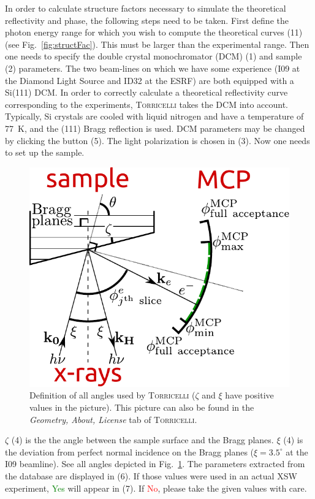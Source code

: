 \documentclass[oldfontcommands,openany,oneside]{memoir}
\begin{document}
In order to calculate structure factors necessary to simulate the theoretical reflectivity and phase, the following steps need to be taken. First define the photon energy range for which you wish to compute the theoretical curves (11) (see Fig.~\ref{fig:structFac}). This must be larger than the experimental range. Then one needs to specify the double crystal monochromator (DCM) (1) and sample (2) parameters. The two beam-lines on which we have some experience (I09 at the Diamond Light Source and ID32 at the ESRF) are both equipped with a Si(111) DCM. In order to correctly calculate a theoretical reflectivity curve corresponding to the experiments, \textsc{Torricelli} takes the DCM into account. Typically, Si crystals are cooled with liquid nitrogen and have a temperature of 77~K, and the (111) Bragg reflection is used. DCM parameters may be changed by clicking the  button (5). The light polarization is chosen in (3). Now one needs to set up the sample.
\begin{figure}[!t]
  \centering
  \includegraphics[width=.7\textwidth]{img/Geometry.pdf}
  \caption{Definition of all angles used by \textsc{Torricelli} ($\zeta$ and $\xi$ have positive values in the picture). This picture can also be found in the \emph{Geometry, About, License} tab  of \textsc{Torricelli}.}
  \label{fig:geometry}
\end{figure}
$\zeta$ (4) is the the angle between the sample surface and the Bragg planes. $\xi$ (4) is the deviation from perfect normal incidence on the Bragg planes ($\xi=3.5^\circ$ at the I09 beamline). See all angles depicted in Fig.~\ref{fig:geometry}. The parameters extracted from the database are displayed in (6). If those values were used in an actual XSW experiment, \textcolor{green}{Yes} will appear in (7). If \textcolor{red}{No}, please take the given values with care.
\end{document}
